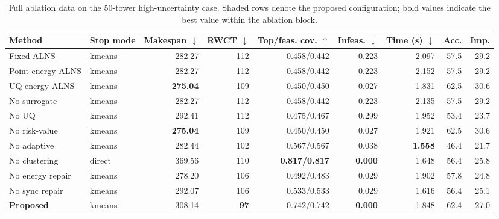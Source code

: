 \begin{table}[H]
\centering
\caption{Full ablation data on the 50-tower high-uncertainty case. Shaded rows denote the proposed configuration; bold values indicate the best value within the ablation block.}
\label{tab:ablation-results}
\small
\setlength{\tabcolsep}{2.7pt}
\begin{tabular}{@{}llrrrrrrr@{}}
\toprule
Method & Stop mode & Makespan $\downarrow$ & RWCT $\downarrow$ & Top/feas. cov. $\uparrow$ & Infeas. $\downarrow$ & Time (s) $\downarrow$ & Acc. & Imp. \\
\midrule
Fixed ALNS & kmeans & 282.27 & 112 & 0.458/0.442 & 0.223 & 2.097 & 57.5 & 29.2 \\
Point energy ALNS & kmeans & 282.27 & 112 & 0.458/0.442 & 0.223 & 2.152 & 57.5 & 29.2 \\
UQ energy ALNS & kmeans & \textbf{275.04} & 109 & 0.450/0.450 & 0.027 & 1.831 & 62.5 & 30.6 \\
No surrogate & kmeans & 282.27 & 112 & 0.458/0.442 & 0.223 & 2.135 & 57.5 & 29.2 \\
No UQ & kmeans & 292.41 & 112 & 0.475/0.467 & 0.299 & 1.952 & 53.4 & 23.7 \\
No risk-value & kmeans & \textbf{275.04} & 109 & 0.450/0.450 & 0.027 & 1.921 & 62.5 & 30.6 \\
No adaptive & kmeans & 282.44 & 102 & 0.567/0.567 & 0.038 & \textbf{1.558} & 46.4 & 21.7 \\
No clustering & direct & 369.56 & 110 & \textbf{0.817/0.817} & \textbf{0.000} & 1.648 & 56.4 & 25.8 \\
No energy repair & kmeans & 278.20 & 106 & 0.492/0.483 & 0.029 & 1.902 & 57.8 & 24.8 \\
No sync repair & kmeans & 292.07 & 106 & 0.533/0.533 & 0.029 & 1.616 & 56.4 & 25.1 \\
\rowcolor{gray!10}
\textbf{Proposed} & kmeans & 308.14 & \textbf{97} & 0.742/0.742 & \textbf{0.000} & 1.848 & 62.4 & 27.0 \\
\bottomrule
\end{tabular}
\end{table}
